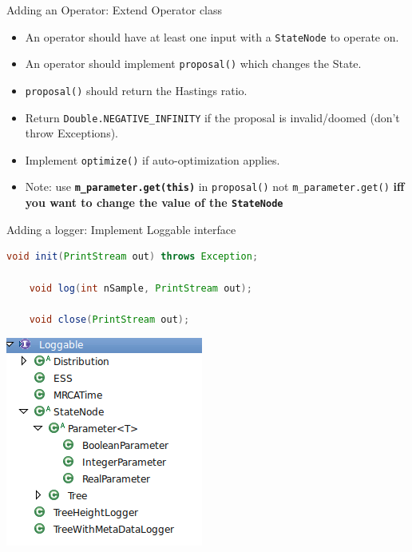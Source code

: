 \documentclass{beamer}
\theoremstyle{definition}
\begin{document}
\begin{frame}[containsverbatim]{Adding an Operator: Extend Operator class}

\begin{itemize}
\item An operator should have at least one input with a {\tt StateNode} to operate on.
\item An operator should implement {\tt proposal()} which changes the State.
\item {\tt proposal()} should return the Hastings ratio.
\item Return {\tt Double.NEGATIVE\_INFINITY} if the proposal is invalid/doomed
(don't throw Exceptions).
\item Implement {\tt optimize()} if auto-optimization applies.
\item
Note: use {\tt\bf \color{red}m\_parameter.get(this)} in {\tt proposal()} not {\tt \color{blue}m\_parameter.get()}
{\bf iff you want to change the value of the {\tt StateNode}}
\end{itemize}


\end{frame}


\begin{frame}[containsverbatim]{Adding a logger: Implement Loggable interface}

\begin{lstlisting}[language=java]
    void init(PrintStream out) throws Exception;

    void log(int nSample, PrintStream out);

    void close(PrintStream out);
\end{lstlisting}

\includegraphics[widht=0.5\textwidth]{loggables.png}

\end{frame}
\end{document}
